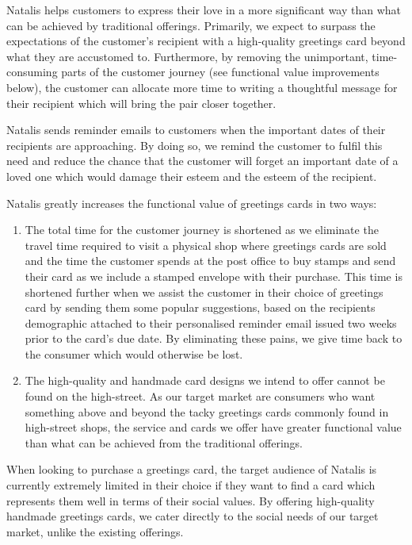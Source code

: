 \documentclass[10pt,a4paper]{article}
\begin{document}
Natalis helps customers to express their love in a more significant way than what can be achieved by traditional offerings. Primarily, we expect to surpass the expectations of the customer's recipient with a high-quality greetings card beyond what they are accustomed to. Furthermore, by removing the unimportant, time-consuming parts of the customer journey (see functional value improvements below), the customer can allocate more time to writing a thoughtful message for their recipient which will bring the pair closer together.

Natalis sends reminder emails to customers when the important dates of their recipients are approaching. By doing so, we remind the customer to fulfil this need and reduce the chance that the customer will forget an important date of a loved one which would damage their esteem and the esteem of the recipient.

Natalis greatly increases the functional value of greetings cards in two ways:
\begin{enumerate}
	\item The total time for the customer journey is shortened as we eliminate the travel time required to visit a physical shop where greetings cards are sold and the time the customer spends at the post office to buy stamps and send their card as we include a stamped envelope with their purchase. This time is shortened further when we assist the customer in their choice of greetings card by sending them some popular suggestions, based on the recipients demographic attached to their personalised reminder email issued two weeks prior to the card's due date. By eliminating these pains, we give time back to the consumer which would otherwise be lost.
	\item The high-quality and handmade card designs we intend to offer cannot be found on the high-street. As our target market are consumers who want something above and beyond the tacky greetings cards commonly found in high-street shops, the service and cards we offer have greater functional value than what can be achieved from the traditional offerings.
\end{enumerate}

When looking to purchase a greetings card, the target audience of Natalis is currently extremely limited in their choice if they want to find a card which represents them well in terms of their social values. By offering high-quality handmade greetings cards, we cater directly to the social needs of our target market, unlike the existing offerings.
\end{document}
